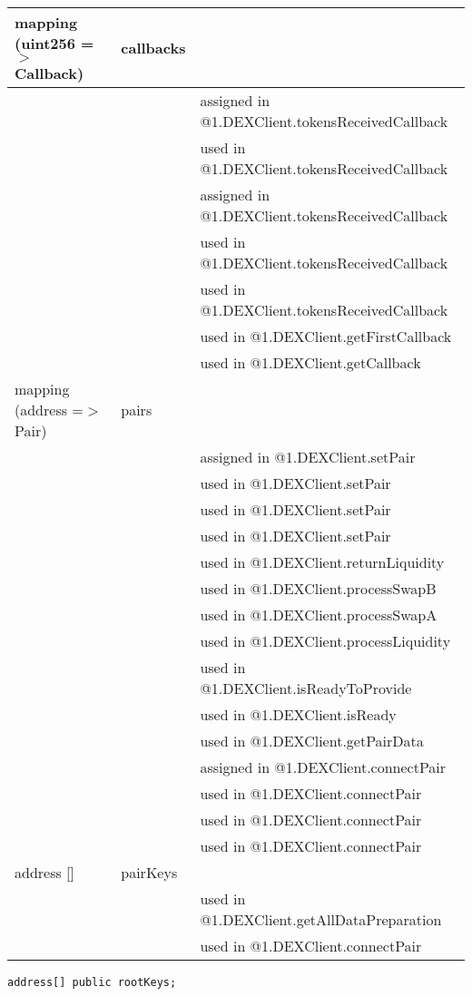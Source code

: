 \begin{tabular}{|l|l|p{5cm}|}
mapping (uint256 =$>$ Callback) & callbacks &  \\\hline
 & & assigned in @1.DEXClient.tokensReceivedCallback\\\hline
 & & used in @1.DEXClient.tokensReceivedCallback\\\hline
 & & assigned in @1.DEXClient.tokensReceivedCallback\\\hline
 & & used in @1.DEXClient.tokensReceivedCallback\\\hline
 & & used in @1.DEXClient.tokensReceivedCallback\\\hline
 & & used in @1.DEXClient.getFirstCallback\\\hline
 & & used in @1.DEXClient.getCallback\\\hline
mapping (address =$>$ Pair) & pairs &  \\\hline
 & & assigned in @1.DEXClient.setPair\\\hline
 & & used in @1.DEXClient.setPair\\\hline
 & & used in @1.DEXClient.setPair\\\hline
 & & used in @1.DEXClient.setPair\\\hline
 & & used in @1.DEXClient.returnLiquidity\\\hline
 & & used in @1.DEXClient.processSwapB\\\hline
 & & used in @1.DEXClient.processSwapA\\\hline
 & & used in @1.DEXClient.processLiquidity\\\hline
 & & used in @1.DEXClient.isReadyToProvide\\\hline
 & & used in @1.DEXClient.isReady\\\hline
 & & used in @1.DEXClient.getPairData\\\hline
 & & assigned in @1.DEXClient.connectPair\\\hline
 & & used in @1.DEXClient.connectPair\\\hline
 & & used in @1.DEXClient.connectPair\\\hline
 & & used in @1.DEXClient.connectPair\\\hline
address [] & pairKeys &  \\\hline
 & & used in @1.DEXClient.getAllDataPreparation\\\hline
 & & used in @1.DEXClient.connectPair\\\hline
\end{tabular}
\fi


\begin{lstlisting}[firstnumber=35]
  address[] public rootKeys;
\end{lstlisting}

